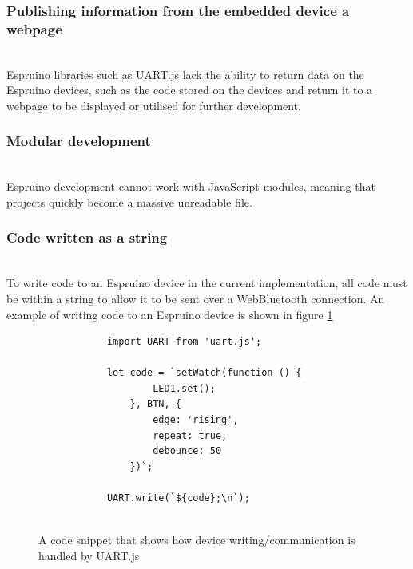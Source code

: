 \documentclass{l4proj}
\begin{document}
\subsubsection{Publishing information from the embedded device a webpage}\hfill\\
Espruino libraries such as UART.js lack the ability to return data on the Espruino devices, such as the code stored on the devices and return it to a webpage to be displayed or utilised for further development.

\subsubsection{Modular development}\hfill\\
Espruino development cannot work with JavaScript modules, meaning that  projects quickly become a massive unreadable file. 

\subsubsection{Code written as a string}\hfill\\
To write code to an Espruino device in the current implementation, all code must be within a string to allow it to be sent over a WebBluetooth connection. An example of writing code to an Espruino device is shown in figure \ref{fig:OLD_UART_DEVICE_WRITING_CODE}




    \begin{figure}[H]
    \centering
    \begin{minipage}{8cm}
        
    
        \begin{lstlisting}
            import UART from 'uart.js';
        
            let code = `setWatch(function () {
                    LED1.set();
                }, BTN, {
                    edge: 'rising',
                    repeat: true,
                    debounce: 50
                })`;

            UART.write(`${code};\n`);
            
        \end{lstlisting}
        \end{minipage}
        \caption{A code snippet that shows how device writing/communication is handled by UART.js}
        \label{fig:OLD_UART_DEVICE_WRITING_CODE}
    \end{figure}
\end{document}
